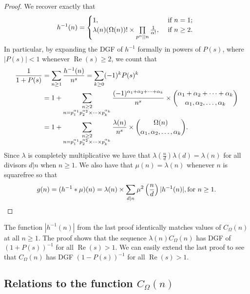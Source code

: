 \documentclass[11pt,reqno,a4letter]{article}
\numberwithin{equation}{section}
\numberwithin{figure}{section}
\numberwithin{table}{section}
\newcommand{\cf}{cf.~}
\theoremstyle{plain}
\numberwithin{theorem}{section}
\theoremstyle{definition}
\theoremstyle{remark}
\renewcommand{\Re}{\operatorname{Re}}
\newcommand{\mathtext}[1]{\text{\rm #1}}
\begin{document}
\begin{proof}
We recover exactly that \cite[\cf \S 2]{FROBERG-1968} 
\begin{equation} 
\notag 
h^{-1}(n) = \begin{cases} 
     1, & \text{ if $n = 1$; } \\ 
     \lambda(n) (\Omega(n))! \times \prod\limits_{p^{\alpha} || n} \frac{1}{\alpha!}, & 
     \text{ if $n \geq 2$. }
     \end{cases}
\end{equation} 
In particular, by expanding the DGF of 
$h^{-1}$ formally in powers of $P(s)$, where $|P(s)| < 1$ whenever $\Re(s) \geq 2$, 
we count that 
\begin{align}
\notag
\frac{1}{1+P(s)} & = \sum_{n \geq 1} \frac{h^{-1}(n)}{n^s} = \sum_{k \geq 0} (-1)^k P(s)^k \\ 
\notag
     & = 
     1 + \sum_{\substack{n \geq 2 \\ n =p_1^{\alpha_1}p_2^{\alpha_2} \times \cdots \times p_k^{\alpha_k}}} 
     \frac{(-1)^{\alpha_1+\alpha_2+\cdots+\alpha_k}}{n^s} \times 
     \binom{\alpha_1+\alpha_2+\cdots+\alpha_k}{\alpha_1,\alpha_2,\ldots,\alpha_k} \\ 
\label{eqn_COmeganMultinomExp_as_DGFSeries_v2}
     & = 
     1 + \sum_{\substack{n \geq 2 \\ n =p_1^{\alpha_1}p_2^{\alpha_2} \times \cdots \times p_k^{\alpha_k}}} 
     \frac{\lambda(n)}{n^s} \times \binom{\Omega(n)}{\alpha_1,\alpha_2,\ldots,\alpha_k}. 
\end{align}
Since $\lambda$ is completely multiplicative we have that 
$\lambda\left(\frac{n}{d}\right) \lambda(d) = \lambda(n)$ for all divisors 
$d|n$ when $n \geq 1$. We also have that $\mu(n) = \lambda(n)$ 
whenever $n$ is squarefree so that
\[
g(n) = (h^{-1} \ast \mu)(n) = \lambda(n) \times 
     \sum_{d|n} \mu^2\left(\frac{n}{d}\right) |h^{-1}(n)|, \mathtext{ for } n \geq 1. 
     \qedhere 
\]
\end{proof} 

The function $|h^{-1}(n)|$ from the last proof identically matches  
values of $C_{\Omega}(n)$ at all $n \geq 1$. 
The proof shows that the sequence $\lambda(n) C_{\Omega}(n)$ has 
DGF of $(1 + P(s))^{-1}$ for all $\Re(s) > 1$. We can easily extend the last proof to 
see that $C_{\Omega}(n)$ has DGF $(1-P(s))^{-1}$ for all $\Re(s) > 1$. 

\subsection{Relations to the function $C_{\Omega}(n)$} 
\label{Section_InvFunc_PreciseExpsAndAsymptotics} 
\label{subSection_Relating_CknFuncs_to_gInvn} 
\end{document}
